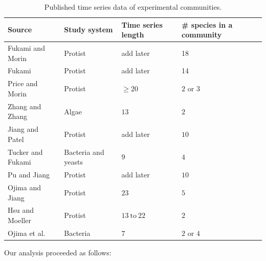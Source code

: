 \documentclass[12pt, class=article, crop=false]{standalone}
\begin{document}
\begin{table}
    \flushleft
    \caption{Published time series data of experimental communities.}
    \begin{tabular}{llll}
         Source & Study system & Time series length & \# species in a community\\
         \hline
         Fukami and Morin \citep{fukami_productivity-biodiversity_2003} & Protist & add later & 18\\
         Fukami \citep{fukami_assembly_2004} & Protist & add later & 14\\
         Price and Morin \citep{price_colonization_2004} & Protist & $\ge 20$ & $2$ or $3$ \\
         Zhang and Zhang \citep{zhang_colonization_2007} & Algae & $13$ & $2$\\
         Jiang and Patel \citep{jiang_community_2008} & Protist & add later & $10$\\
         Tucker and Fukami \citep{tucker_environmental_2014} & Bacteria and yeasts & $9$ & $4$\\
         Pu and Jiang \citep{pu_dispersal_2015} & Protist & add later & $10$\\
         Ojima and Jiang \citep{ojima_interactive_2017} & Protist & $23$ & $5$\\
         Hsu and Moeller \citep{hsu_metabolic_2021} & Protist & $13~\mbox{to}~22$ & $2$\\
         Ojima et al. \citep{ojima_priority_2022} & Bacteria & $7$ & $2$ or $4$\\
         \hline
    \end{tabular}
    \label{tab:expdata}
\end{table}

Our analysis proceeded as follows:
\end{document}
